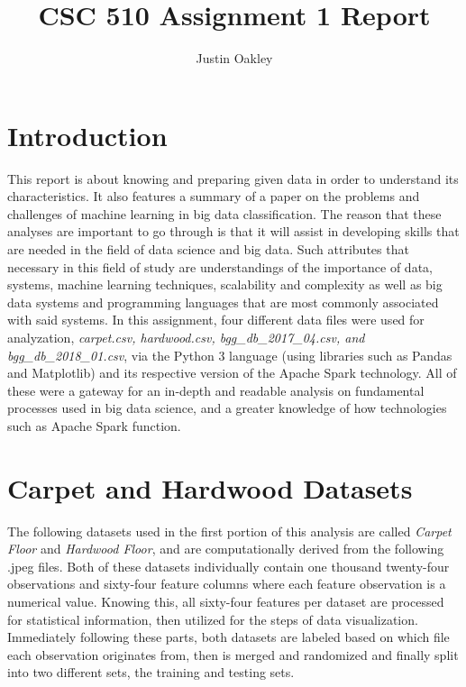 \documentclass[a4paper,12pt]{IEEEtran}
\begin{document}
\title{CSC 510 Assignment 1 Report}
\author{Justin Oakley}
\maketitle

\tableofcontents
\newpage

\section{Introduction}
This report is about knowing and preparing given data in order to understand its characteristics. It also features a summary of a paper on the problems and challenges of machine learning in big data classification. The reason that these analyses are important to go through is that it will assist in developing skills that are needed in the field of data science and big data. Such attributes that necessary in this field of study are understandings of the importance of data, systems, machine learning techniques, scalability and complexity as well as big data systems and programming languages that are most commonly associated with said systems. In this assignment, four different data files were used for analyzation, \textit{carpet.csv, hardwood.csv, bgg\_db\_2017\_04.csv, and bgg\_db\_2018\_01.csv}, via the Python 3 language (using libraries such as Pandas and Matplotlib) and its respective version of the Apache Spark technology. All of these were a gateway for an in-depth and readable analysis on fundamental processes used in big data science, and a greater knowledge of how technologies such as Apache Spark function.

\section{Carpet and Hardwood Datasets}
The following datasets used in the first portion of this analysis are called \textit{Carpet Floor} and \textit{Hardwood Floor}, and are computationally derived from the following .jpeg files. Both of these datasets individually contain one thousand twenty-four observations and sixty-four feature columns where each feature observation is a numerical value. Knowing this, all sixty-four features per dataset are processed for statistical information, then utilized for the steps of data visualization. Immediately following these parts, both datasets are labeled based on which file each observation originates from, then is merged and randomized and finally split into two different sets, the training and testing sets.
\end{document}

